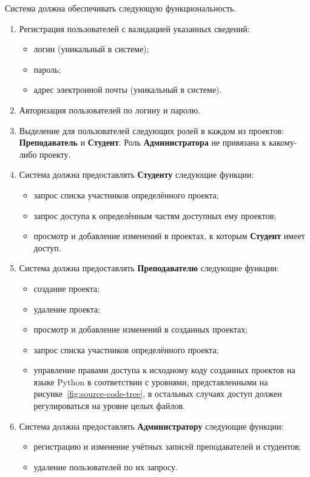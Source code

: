 \documentclass{bmstu}
\begin{document}
  Система должна обеспечивать следующую функциональность.
  \begin{enumerate}[label*=\arabic*.]
    \item Регистрация пользователей с валидацией указанных
      сведений:
      \begin{itemize}[label=---]
        \item логин (уникальный в системе);
        \item пароль;
        \item адрес электронной почты (уникальный в системе).
      \end{itemize}
    \item Авторизация пользователей по логину и паролю.
    \item Выделение для пользователей следующих ролей в каждом из проектов:
      \textbf{Преподаватель} и \textbf{Студент}.
      Роль \textbf{Администратора} не привязана к какому-либо проекту.
    \item Система должна предоставлять \textbf{Студенту} следующие функции:
    \begin{itemize}[label=---]
    	\item запрос списка участников определённого проекта;
    	\item запрос доступа к определённым частям доступных ему проектов;
    	\item просмотр и добавление изменений в проектах, к которым
    	  \textbf{Студент} имеет доступ.
    \end{itemize}
    \item Система должна предоставлять \textbf{Преподавателю} следующие
      функции:
    \begin{itemize}[label=---]
    	\item создание проекта;
    	\item удаление проекта;
    	\item просмотр и добавление изменений в созданных проектах;
    	\item запрос списка участников определённого проекта;
    	\item управление правами доступа к исходному коду созданных проектов на
    	  языке Python в соответствии с уровнями, представленными на
    	  рисунке~\ref{fig:source-code-tree}, в остальных случаях доступ должен
    	  регулироваться на уровне целых файлов.
    \end{itemize}
    \item Система должна предоставлять \textbf{Администратору} следующие
      функции:
    \begin{itemize}[label=---]
    	\item регистрацию и изменение учётных записей преподавателей и студентов;
    	\item удаление пользователей по их запросу.
    \end{itemize}
  \end{enumerate}
\end{document}
